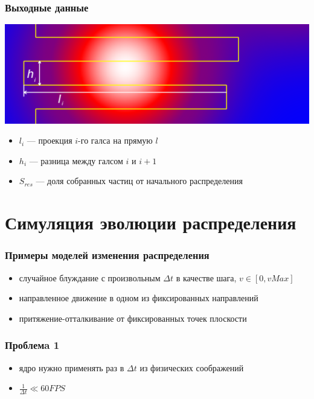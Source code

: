 \documentclass{beamer} %
\theoremstyle{definition} %
\begin{document}
\begin{frame}
  \frametitle{Выходные данные}
\includegraphics[width=\textwidth]{pics/pic06-lh.png}
\begin{itemize}
  \item $l_i$ --- проекция $i$-го галса на прямую $l$
  \item $h_i$ --- разница между галсом $i$ и $i+1$
  \item $S_{res}$ --- доля собранных частиц от начального распределения
\end{itemize}

\end{frame}

\section{Симуляция эволюции распределения} %

\begin{frame} 
\frametitle{Примеры моделей изменения распределения}
\begin{itemize}
\item{случайное блуждание с произвольным $\Delta t$ в качестве шага, $v \in [0, vMax]$}
\item{направленное движение в одном из фиксированных направлений}
\item{притяжение-отталкивание от фиксированных точек плоскости}
\end{itemize}
\end{frame}

\begin{frame}
\frametitle{Проблемa 1}
\begin{itemize}
  \item{ядро нужно применять раз в $\Delta t$ из физических соображений}
  \item{$\frac{1}{\Delta t} \ll 60FPS$} 
\end{itemize}
\end{frame}
\end{document}
